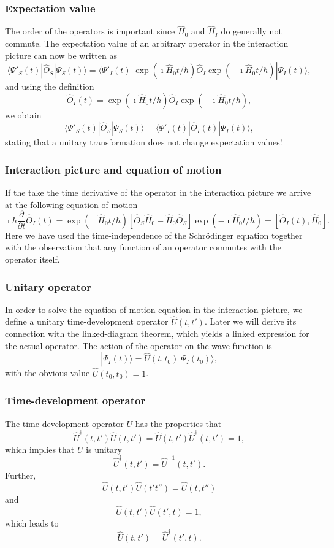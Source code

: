 \documentclass{beamer}
\begin{document}
\begin{frame}
\frametitle{Expectation value}

The order of the operators is important since $\hat{H}_0$ and $\hat{H}_I$ do generally not commute.
The expectation value of
an arbitrary operator in the interaction picture can now be written as
\[
\langle \Psi'_S(t)|\hat{O}_S|\Psi_S(t)\rangle = 
\langle \Psi'_I(t) |\exp{(\imath\hat{H}_0t/\hbar)}\hat{O}_I
\exp{(-\imath\hat{H}_0t/\hbar)}|\Psi_I(t)\rangle,
\]
and using the definition
\[
\hat{O}_I(t)=
\exp{(\imath\hat{H}_0t/\hbar)}\hat{O}_I\exp{(-\imath\hat{H}_0t/\hbar)},
\]
we obtain
\[
\langle \Psi'_S(t)|\hat{O}_S|\Psi_S(t)\rangle = 
\langle \Psi'_I(t) |\hat{O}_I(t)|\Psi_I(t)\rangle,
\]
stating that a unitary transformation does not change expectation values!
\end{frame}

\begin{frame}
\frametitle{Interaction picture and equation of motion}

If the take the time derivative of the operator in the interaction picture we arrive at the following equation of motion
\[
\imath \hbar\frac{\partial }{\partial t}\hat{O}_I(t) = \exp{(\imath\hat{H}_0t/\hbar)}\left[\hat{O}_S\hat{H}_0-\hat{H}_0\hat{O}_S\right]\exp{(-\imath\hat{H}_0t/\hbar)}=\left[\hat{O}_I(t),\hat{H}_0\right].
\]
Here we have used the time-independence of the Schrödinger equation
together with the observation that any function of an operator commutes with the operator itself.
\end{frame}

\begin{frame}
\frametitle{Unitary operator}

In order to solve the equation of motion equation in the interaction picture, we define a unitary
time-development operator $\hat{U}(t,t')$. Later we will derive its
connection with the linked-diagram theorem, which yields a
linked expression for the actual operator. 
The action of the operator on the wave function is
\[
|\Psi_I(t) \rangle = \hat{U}(t,t_0)|\Psi_I(t_0)\rangle,
\]
with the obvious value $\hat{U}(t_0,t_0)=1$.
\end{frame}

\begin{frame}
\frametitle{Time-development operator}

The time-development operator $U$ has the
properties that
\[
     \hat{U}^{\dagger}(t,t')\hat{U}(t,t')=\hat{U}(t,t')\hat{U}^{\dagger}(t,t')=1,
\]
which implies that $U$ is unitary
\[
     \hat{U}^{\dagger}(t,t')=\hat{U}^{-1}(t,t').
\]
Further,
\[
    \hat{U}(t,t')\hat{U}(t't'')=\hat{U}(t,t'')
\]
and
\[
    \hat{U}(t,t')\hat{U}(t',t)=1,
\]
which leads to
\[
    \hat{U}(t,t')=\hat{U}^{\dagger}(t',t).
\]
\end{frame}
\end{document}

